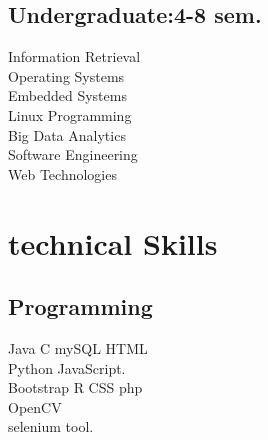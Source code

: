 \documentclass[]{deedy-resume-openfont}
\begin{document}
\begin{minipage}[t]{0.33\textwidth}
\subsection{Undergraduate:4-8 sem.}
Information Retrieval \\
Operating Systems \\
Embedded Systems\\
Linux Programming \\
Big Data Analytics \\
Software Engineering\\

Web Technologies\\
\sectionsep


\section{technical Skills}
\subsection{Programming}
Java \textbullet{}   C \textbullet{} mySQL \textbullet{} HTML \\
 Python \textbullet{} JavaScript.  \\ 
 \sectionsep
{}
Bootstrap \textbullet{} R \textbullet{} CSS \textbullet{} php\\
OpenCV \\
\sectionsep
{}
selenium tool.    \\
\sectionsep

%
%

\end{minipage} 
\hfill
\end{document}
